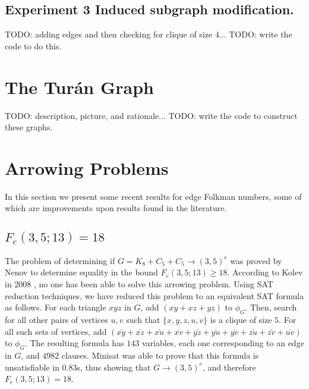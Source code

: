 \documentclass[paper=a4, fontsize=11pt]{scrartcl} %
\begin{document}
\subsection{Experiment 3 Induced subgraph modification.}
TODO: adding edges and then checking for clique of size 4...
TODO: write the code to do this.

\section{The Tur\'{a}n Graph}
TODO: description, picture, and rationale...
TODO: write the code to construct these graphs.


\section{Arrowing Problems}
In this section we present some recent results for edge Folkman numbers, some of which are improvements
upon results found in the literature.

\label{sec:arrowComputations}
\subsection{$F_e(3,5;13) = 18$}
The problem of determining if $G = K_8 + C_5 + C_5 \to (3,5)^e$ was proved by Nenov \cite{Nenov83-1}
to determine equality in the bound $F_e(3,5;13) \geq 18$. According to Kolev in 2008 \cite{Kolev08-2},
no one has been able to solve this arrowing problem. Using SAT reduction techniques, we have 
reduced this problem to an equivalent SAT formula as follows. For each triangle $xyz$ in $G$, add
$(xy + xz + yz)$ to $\phi_G$. Then, search for all other pairs of vertices $u,v$ such that $\{x,y,z,u,v\}$ is a clique
of size $5$. For all such sets of vertices, add $(\bar{xy} + \bar{xz} + \bar{xu} + \bar{xv} + \bar{yz} + \bar{yu} + \bar{yv} + \bar{zu} + \bar{zv} + \bar{uv})$
to $\phi_G$. The resulting formula has $143$ variables, each one corresponding to an edge in $G$,
and $4982$ clauses. Minisat was able to prove that this formula is unsatisfiable in 0.83s, thus
showing that $G \to (3,5)^e$, and therefore $F_e(3,5;13) = 18$.
\end{document}
